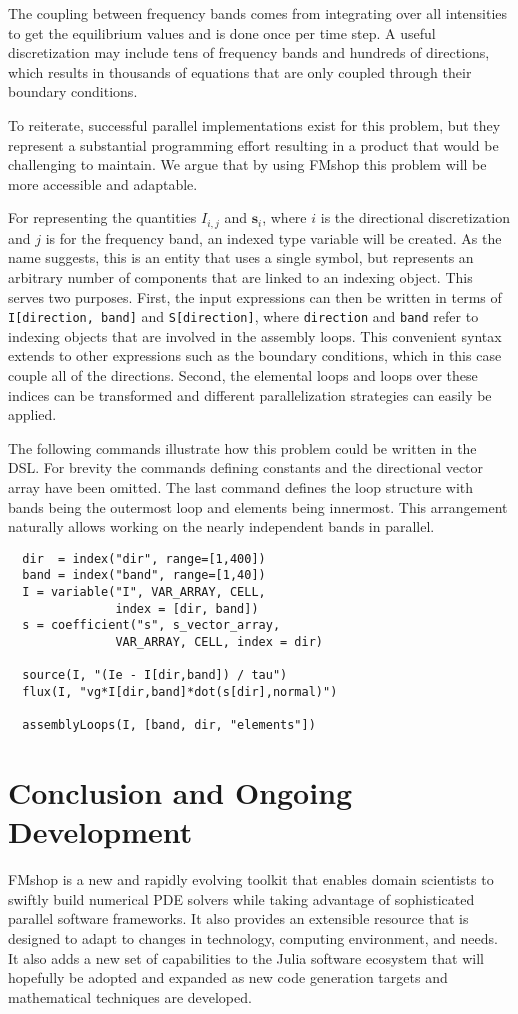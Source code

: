 \documentclass[twoside,leqno,twocolumn]{article}
\begin{document}
The coupling between frequency bands comes from integrating over all intensities to get the equilibrium values and is done once per time step. A useful discretization may include tens of frequency bands and hundreds of directions\cite{bte}, which results in thousands of equations that are only coupled through their boundary conditions. 

To reiterate, successful parallel implementations exist for this problem, but they represent a substantial programming effort resulting in a product that would be challenging to maintain. We argue that by using FMshop this problem will be more accessible and adaptable.

For representing the quantities $I_{i,j}$ and $\textbf{s}_{i}$, where $i$ is the directional discretization and $j$ is for the frequency band, an indexed type variable will be created. As the name suggests, this is an entity that uses a single symbol, but represents an arbitrary number of components that are linked to an indexing object. This serves two purposes. First, the input expressions can then be written in terms of \texttt{I[direction, band]} and \texttt{S[direction]}, where \texttt{direction} and \texttt{band} refer to indexing objects that are involved in the assembly loops. This convenient syntax extends to other expressions such as the boundary conditions, which in this case couple all of the directions. Second, the elemental loops and loops over these indices can be transformed and different parallelization strategies can easily be applied.

The following commands illustrate how this problem could be written in the DSL. For brevity the commands defining constants and the directional vector array have been omitted. The last command defines the loop structure with bands being the outermost loop and elements being innermost. This arrangement naturally allows working on the nearly independent bands in parallel.
\begin{verbatim}
  dir  = index("dir", range=[1,400])
  band = index("band", range=[1,40])
  I = variable("I", VAR_ARRAY, CELL, 
               index = [dir, band])
  s = coefficient("s", s_vector_array, 
               VAR_ARRAY, CELL, index = dir)

  source(I, "(Ie - I[dir,band]) / tau")
  flux(I, "vg*I[dir,band]*dot(s[dir],normal)")

  assemblyLoops(I, [band, dir, "elements"])
\end{verbatim}

\section{Conclusion and Ongoing Development}
FMshop is a new and rapidly evolving toolkit that enables domain scientists to swiftly build numerical PDE solvers while taking advantage of sophisticated parallel software frameworks. It also provides an extensible resource that is designed to adapt to changes in technology, computing environment, and needs. It also adds a new set of capabilities to the Julia software ecosystem that will hopefully be adopted and expanded as new code generation targets and mathematical techniques are developed.
\end{document}
